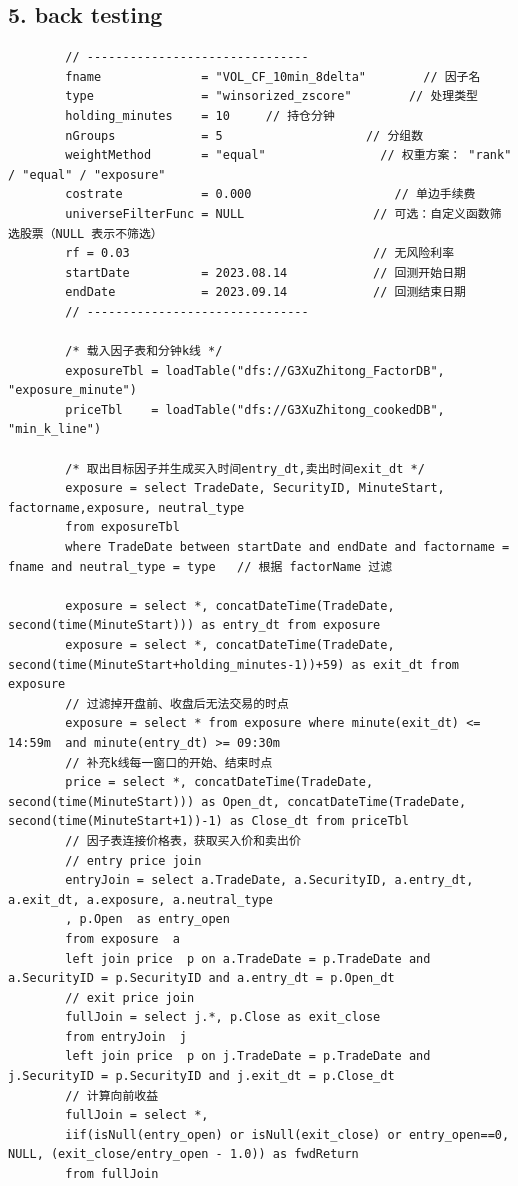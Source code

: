 \documentclass[10pt,a4paper]{article}
\begin{document}
	\subsection*{5. back testing}
	\begin{lstlisting}
		// -------------------------------
		fname              = "VOL_CF_10min_8delta"        // 因子名
		type               = "winsorized_zscore"        // 处理类型
		holding_minutes    = 10     // 持仓分钟
		nGroups            = 5                    // 分组数
		weightMethod       = "equal"                // 权重方案： "rank" / "equal" / "exposure"
		costrate           = 0.000                    // 单边手续费
		universeFilterFunc = NULL                  // 可选：自定义函数筛选股票（NULL 表示不筛选）
		rf = 0.03                                  // 无风险利率
		startDate          = 2023.08.14            // 回测开始日期
		endDate            = 2023.09.14            // 回测结束日期
		// -------------------------------
		
		/* 载入因子表和分钟k线 */
		exposureTbl = loadTable("dfs://G3XuZhitong_FactorDB", "exposure_minute")   
		priceTbl    = loadTable("dfs://G3XuZhitong_cookedDB", "min_k_line")
		
		/* 取出目标因子并生成买入时间entry_dt,卖出时间exit_dt */
		exposure = select TradeDate, SecurityID, MinuteStart, factorname,exposure, neutral_type 
		from exposureTbl 
		where TradeDate between startDate and endDate and factorname = fname and neutral_type = type   // 根据 factorName 过滤
		
		exposure = select *, concatDateTime(TradeDate, second(time(MinuteStart))) as entry_dt from exposure
		exposure = select *, concatDateTime(TradeDate, second(time(MinuteStart+holding_minutes-1))+59) as exit_dt from exposure
		// 过滤掉开盘前、收盘后无法交易的时点
		exposure = select * from exposure where minute(exit_dt) <= 14:59m  and minute(entry_dt) >= 09:30m
		// 补充k线每一窗口的开始、结束时点
		price = select *, concatDateTime(TradeDate, second(time(MinuteStart))) as Open_dt, concatDateTime(TradeDate, second(time(MinuteStart+1))-1) as Close_dt from priceTbl
		// 因子表连接价格表，获取买入价和卖出价
		// entry price join
		entryJoin = select a.TradeDate, a.SecurityID, a.entry_dt, a.exit_dt, a.exposure, a.neutral_type
		, p.Open  as entry_open
		from exposure  a
		left join price  p on a.TradeDate = p.TradeDate and a.SecurityID = p.SecurityID and a.entry_dt = p.Open_dt
		// exit price join
		fullJoin = select j.*, p.Close as exit_close
		from entryJoin  j
		left join price  p on j.TradeDate = p.TradeDate and j.SecurityID = p.SecurityID and j.exit_dt = p.Close_dt
		// 计算向前收益
		fullJoin = select *, 
		iif(isNull(entry_open) or isNull(exit_close) or entry_open==0, NULL, (exit_close/entry_open - 1.0)) as fwdReturn
		from fullJoin
		

\end{lstlisting}
\end{document}
